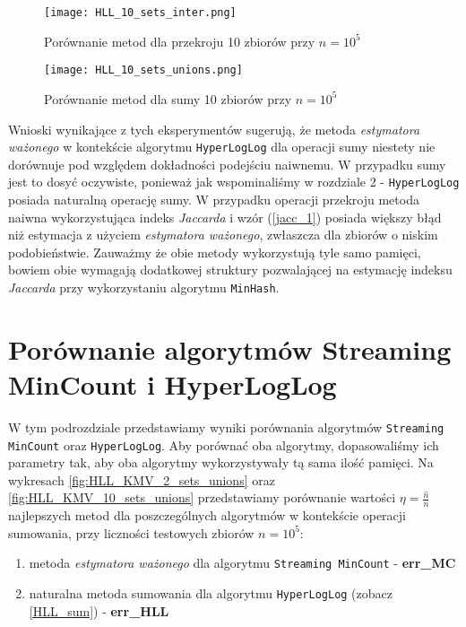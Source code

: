 \begin{figure}[h!]
    \texttt{[image: HLL\_10\_sets\_inter.png]}
    \centering
    \caption{Porównanie metod dla przekroju 10 zbiorów przy $n=10^5$}
    \label{fig:HLL_10_sets_inter}
\end{figure}

\begin{figure}[h!]
    \texttt{[image: HLL\_10\_sets\_unions.png]}
    \centering
    \caption{Porównanie metod dla sumy 10 zbiorów przy $n=10^5$}
    \label{fig:HLL_10_sets_unions}
\end{figure}

Wnioski wynikające z tych eksperymentów sugerują, że metoda \textit{estymatora ważonego} w kontekście algorytmu \texttt{HyperLogLog} dla operacji sumy niestety nie dorównuje pod względem dokładności podejściu naiwnemu. W przypadku sumy jest to dosyć oczywiste, ponieważ jak wspominaliśmy w rozdziale 2 - \texttt{HyperLogLog} posiada naturalną operację sumy. W przypadku operacji przekroju metoda naiwna wykorzystująca indeks \textit{Jaccarda} i wzór (\ref{jacc_1}) posiada większy błąd niż estymacja z użyciem \textit{estymatora ważonego}, zwłaszcza dla zbiorów o niskim podobieństwie. Zauważmy że obie metody wykorzystują tyle samo pamięci, bowiem obie wymagają dodatkowej struktury pozwalającej na estymację indeksu \textit{Jaccarda} przy wykorzystaniu algorytmu \texttt{MinHash}.

\section{Porównanie algorytmów Streaming MinCount i HyperLogLog}

W tym podrozdziale przedstawiamy wyniki porównania algorytmów \texttt{Streaming MinCount} oraz \texttt{HyperLogLog}. Aby porównać oba algorytmy, dopasowaliśmy ich parametry tak, aby oba algorytmy wykorzystywały tą sama ilość pamięci. Na wykresach \ref{fig:HLL_KMV_2_sets_unions} oraz \ref{fig:HLL_KMV_10_sets_unions} przedstawiamy porównanie wartości $\eta = \frac{\hat{n}}{n}$ najlepszych metod dla poszczególnych algorytmów w kontekście operacji sumowania, przy liczności testowych zbiorów $n=10^5$:
\begin{enumerate}
	\item metoda \textit{estymatora ważonego} dla algorytmu \texttt{Streaming MinCount} - \textbf{err\_MC}
	\item naturalna metoda sumowania dla algorytmu \texttt{HyperLogLog} (zobacz \ref{HLL_sum}) - \textbf{err\_HLL}
\end{enumerate}

